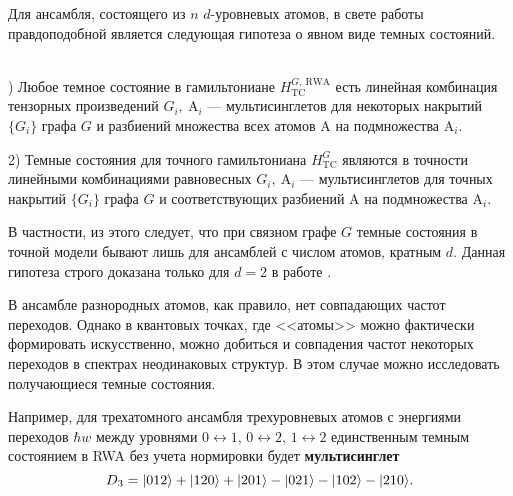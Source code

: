\noindent Для ансамбля, состоящего из $n$ $d$-уровневых атомов, в свете работы \cite{quantum_simulation_homogeneous} правдоподобной является следующая гипотеза о явном виде темных состояний.

\begin{hyp}
	\
	\\
	) Любое темное состояние в гамильтониане $H^{G,~\text{RWA}}_{\text{TC}}$ есть линейная комбинация тензорных произведений $G_{i},~\text{A}_{i}$ --- мультисинглетов для некоторых накрытий $\{ G_{i}\}$ графа $G$ и разбиений множества всех атомов $\text{A}$ на подмножества $\text{A}_{i}$. 
	
	2) Темные состояния для точного гамильтониана $H^G_{\text{TC}}$ являются в точности линейными комбинациями равновесных $G_{i},~\text{A}_{i}$ --- мультисинглетов для точных накрытий $\{ G_{i}\}$ графа $G$ и соответствующих разбиений $\text{A}$ на подмножества $\text{A}_{i}$. 
\end{hyp}

В частности, из этого следует, что при связном графе $G$ темные состояния в точной модели бывают лишь для ансамблей с числом атомов, кратным $d$. Данная гипотеза строго доказана только для $d=2$ в работе \cite{dark_states_dimension}.

В ансамбле разнородных атомов, как правило, нет совпадающих частот переходов. Однако в квантовых точках, где <<атомы>> можно фактически формировать искусственно, можно добиться и совпадения частот некоторых переходов в спектрах неодинаковых структур. В этом случае можно исследовать получающиеся темные состояния.

Например, для трехатомного ансамбля трехуровневых атомов с энергиями переходов $\hbar w$ между уровнями $0 \leftrightarrow 1$, $0 \leftrightarrow 2$, $1 \leftrightarrow 2$ единственным темным состоянием в RWA \cite{ozhigov_qq,rwa_rabi_1,rwa_rabi_2} без учета нормировки будет \textbf{мультисинглет}
\[
	D_{3} = |012\rangle + |120\rangle + |201\rangle - |021\rangle - |102\rangle - |210\rangle.
\]

